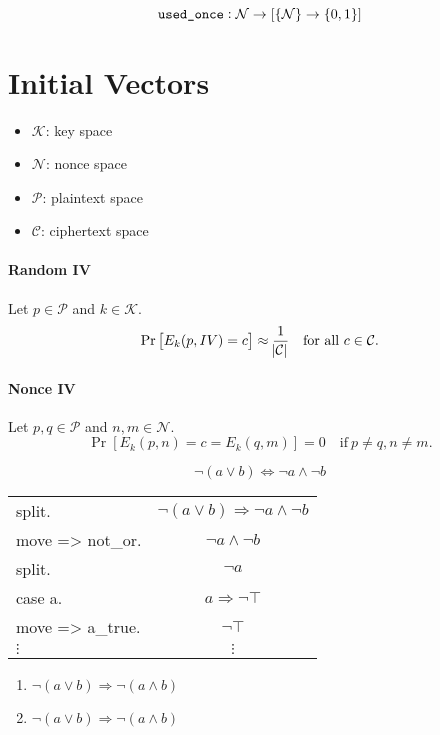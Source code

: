 \[
\texttt{used\_once}:\mathcal{N}\to[\set{\mathcal{N}}\to\set{0,1}]
\]

\newpage
\section{Initial Vectors}

\begin{itemize}
	\item $\mathcal{K}$: key space
	\item $\mathcal{N}$: nonce space
	\item $\mathcal{P}$: plaintext space
	\item $\mathcal{C}$: ciphertext space
\end{itemize}


\paragraph{Random IV}
Let $p\in\mathcal{P}$ and $k\in\mathcal{K}$. %
\[
\Pr\left[E_k(p,IV)=c\right]\approx\frac{1}{\abs{\mathcal{C}}}\quad\text{for all}\ c\in\mathcal{C}.
\]

\paragraph{Nonce IV}
Let $p,q\in\mathcal{P}$ and $n,m\in\mathcal{N}$. \[
\Pr\left[E_k(p,n)=c=E_k(q,m)\right]=0\quad\text{if}\ p\neq q, n\neq m.
\]

\[
\lnot(a\lor b)\iff\lnot a \land \lnot b
\]

\begin{table}[h!]\centering\ttfamily\begin{tabular}{lc}
		split. & $\lnot(a\lor b)\Rightarrow \lnot a \land \lnot b$ \\
		move => not\_or. & $\lnot a \land\lnot b$ \\
		split. & $\lnot a$ \\
		case a. & $a\Rightarrow\lnot\top$ \\
		move => a\_true. & $\lnot\top$ \\
		$\vdots$ & $\vdots$
	\end{tabular}\end{table}
\begin{enumerate}
	\item $\lnot(a\lor b)\Rightarrow\lnot(a\land b)$
	\item $\lnot(a\lor b)\Rightarrow\lnot(a\land b)$
\end{enumerate}
